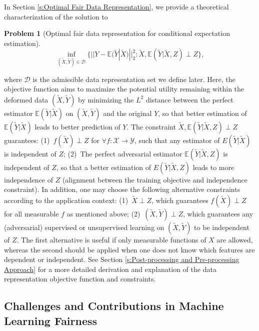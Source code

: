 \documentclass[twoside,11pt]{article}
\newtheorem{prob}{Problem}
\begin{document}
In Section \ref{s:Optimal Fair Data Representation}, we provide a theoretical characterization of the solution to \begin{prob}[Optimal fair data representation for conditional expectation estimation]\label{prob:Optimal Fair Data Representation for Conditional Expectation Estimation}
\begin{equation}\label{eq:optimal fair data representation problem}
\inf_{(\tilde{X}, \tilde{Y}) \in \mathcal{D}} \{ ||Y - \mathbb{E}(\tilde{Y}|\tilde{X})||^2_2 : \tilde{X}, \mathbb{E}(\tilde{Y}|\tilde{X},Z) \perp Z\},
\end{equation}
\end{prob}
where $\mathcal{D}$ is the admissible data representation set we define later. Here, the objective function aims to maximize the potential utility remaining within the deformed data $(\tilde{X},\tilde{Y})$ by minimizing the $L^2$ distance between the perfect estimator $\mathbb{E}(\tilde{Y}|\tilde{X})$ on $(\tilde{X},\tilde{Y})$ and the original $Y$, so that better estimation of $\mathbb{E}(\tilde{Y}|\tilde{X})$ leads to better prediction of $Y$. The constraint $\tilde{X}, \mathbb{E}(\tilde{Y}|\tilde{X},Z) \perp Z$ guarantees: (1)~$f(\tilde{X}) \perp Z$ for $\forall f: \mathcal{X} \rightarrow \mathcal{Y}$, such that any estimator of $E(\tilde{Y}|\tilde{X})$ is independent of $Z$; (2)~The perfect adversarial estimator $\mathbb{E}(\tilde{Y}|\tilde{X},Z)$ is independent of $Z$, so that a better estimation of $E(\tilde{Y}|\tilde{X},Z)$ leads to more independence of $Z$ (alignment between the training objective and independence constraint).  In addition, one may choose the following alternative constraints according to the application context: (1)~$\tilde{X} \perp Z$, which guarantees $f(\tilde{X}) \perp Z$ for all measurable $f$ as mentioned above; (2)~$(\tilde{X}, \tilde{Y}) \perp Z$, which guarantees any (adversarial) supervised or unsupervised learning on $(\tilde{X},\tilde{Y})$ to be independent of $Z$. The first alternative is useful if only measurable functions of $X$ are allowed, whereas the second should be applied when one does not know which features are dependent or independent. See Section \ref{s:Post-processing and Pre-processing Approach} for a more detailed derivation and explanation of the data representation objective function and constraints.

\subsection{Challenges and Contributions in Machine Learning Fairness} \label{s:Challenge and Contribution}
\end{document}
